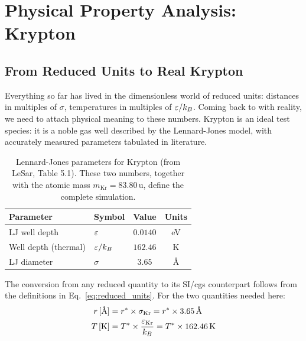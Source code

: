 
\section{Physical Property Analysis: Krypton}

\subsection{From Reduced Units to Real Krypton}

Everything so far has lived in the dimensionless world of reduced units: distances in multiples of $\sigma$, temperatures in multiples of $\varepsilon/k_B$. Coming back to with reality, we need to attach physical meaning to these numbers. Krypton is an ideal test species: it is a noble gas well described by the Lennard-Jones model, with accurately measured parameters tabulated in literature.

\begin{table}[H]
    \centering
    \caption{Lennard-Jones parameters for Krypton (from LeSar, Table 5.1). These two numbers, together with the atomic mass $m_\text{Kr} = 83.80$\,u, define the complete simulation.}
    \label{tab:kr_params}
    \begin{tabular}{llcc}
        \toprule
        \textbf{Parameter} & \textbf{Symbol} & \textbf{Value} & \textbf{Units} \\
        \midrule
        LJ well depth       & $\varepsilon$          & $0.0140$   & eV \\
        Well depth (thermal)& $\varepsilon/k_B$      & $162.46$   & K \\
        LJ diameter         & $\sigma$        & $3.65$     & \AA \\
        \bottomrule
    \end{tabular}
\end{table}

The conversion from any reduced quantity to its SI/cgs counterpart follows from the definitions in Eq.~\eqref{eq:reduced_units}. For the two quantities needed here:
\begin{align}
    r\,[\text{\AA}] &= r^* \times \sigma_{\text{Kr}} = r^* \times 3.65\,\text{\AA}
    \label{eq:r_conv}\\
    T\,[\text{K}]   &= T^* \times \frac{\varepsilon_{\text{Kr}}}{k_B} = T^* \times 162.46\,\text{K}
    \label{eq:T_conv}
\end{align}

